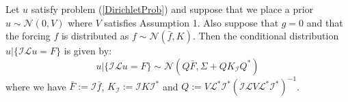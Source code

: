 \begin{proposition}
    \label{first_prop}
    Let $u$ satisfy problem (\ref{DirichletProb}) and suppose that we place a prior $u\sim\mathcal{N}(0,V)$ where $V$ satisfies Assumption 1. Also suppose that $g=0$ and that the forcing $f$ is distributed as $f\sim\mathcal{N}(\bar{f},K)$. Then the conditional distribution $u|\{\mathcal{I}\mathcal{L}u=F\}$ is given by:
    \begin{equation}
        \label{approx_prior}
        u|\{\mathcal{I}\mathcal{L}u=F\}\sim\mathcal{N}(Q\bar{F},\Sigma+QK_{\mathcal{I}}Q^{*})
    \end{equation}
    where we have $\bar{F}:=\mathcal{I}\bar{f}$, $K_{\mathcal{I}}:=\mathcal{I}K\mathcal{I}^{*}$ and $Q:=V\mathcal{L}^{*}\mathcal{I}^{*}(\mathcal{I}\mathcal{L}V\mathcal{L}^{*}\mathcal{I}^{*})^{-1}$.
\end{proposition}

